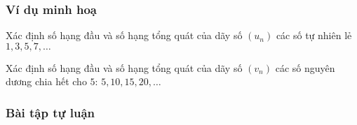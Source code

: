 \subsubsection{Ví dụ minh hoạ}
\begin{vd}[NB]%
	Xác định số hạng đầu và số hạng tổng quát của dãy số $(u_n)$ các số tự nhiên lẻ $1, 3, 5, 7, \ldots $
\end{vd}
\begin{vd}[NB]%
	Xác định số hạng đầu và số hạng tổng quát của dãy số $(v_n)$ các số nguyên dương chia hết cho $5$: $5,10,15,20,\ldots$
\end{vd}
\subsubsection{Bài tập tự luận}
 
